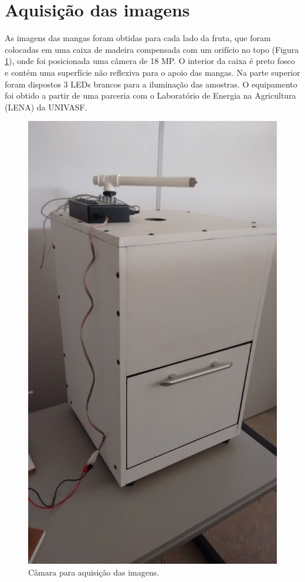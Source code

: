 \section{Aquisição das imagens}

As imagens das mangas foram obtidas para cada lado da fruta, que foram colocadas em uma caixa de madeira compensada com um orifício no topo (Figura \ref{img:caixa}), onde foi posicionada uma câmera de 18 MP. O interior da caixa é preto fosco e contém uma superfície não reflexiva para o apoio das mangas. Na parte superior foram dispostos 3 LEDs brancos para a iluminação das amostras. O equipamento foi obtido a partir de uma parceria com o Laboratório de Energia na Agricultura (LENA) da UNIVASF.

\begin{figure}[H]
\centering
	\caption{Câmara para aquisição das imagens.}\label{img:caixa}
	\includegraphics[scale=0.1]{img/caixa.jpg}
\end{figure}

